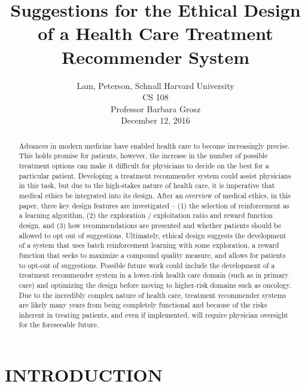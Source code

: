 \documentclass[]{spie}  %
\title{Suggestions for the Ethical Design of a Health Care Treatment Recommender System}
\author{Lam, Peterson, Schnall
\skiplinehalf
Harvard University \\
CS 108 \\
Professor Barbara Grosz \\
December 12, 2016
}
\begin{document}
  \maketitle

\begin{abstract}

Advances in modern medicine have enabled health care to become increasingly precise. This holds promise for patients, however, the increase in the number of possible treatment options can make it difficult for physicians to decide on the best for a particular patient. Developing a treatment recommender system could assist physicians in this task, but due to the high-stakes nature of health care, it is imperative that medical ethics be integrated into its design. After an overview of medical ethics, in this paper, three key design features are investigated – (1) the selection of reinforcement as a learning algorithm, (2) the exploration / exploitation ratio and reward function design, and (3) how recommendations are presented and whether patients should be allowed to opt out of suggestions. Ultimately, ethical design suggests the development of a system that uses batch reinforcement learning with some exploration, a reward function that seeks to maximize a compound quality measure, and allows for patients to opt-out of suggestions. Possible future work could include the development of a treatment recommender system in a lower-risk health care domain (such as in primary care) and optimizing the design before moving to higher-risk domains such as oncology. Due to the incredibly complex nature of health care, treatment recommender systems are likely many years from being completely functional and because of the risks inherent in treating patients, and even if implemented, will require physician oversight for the foreseeable future.
\end{abstract}



\section{INTRODUCTION}
\label{sec:intro}  %
\end{document}
